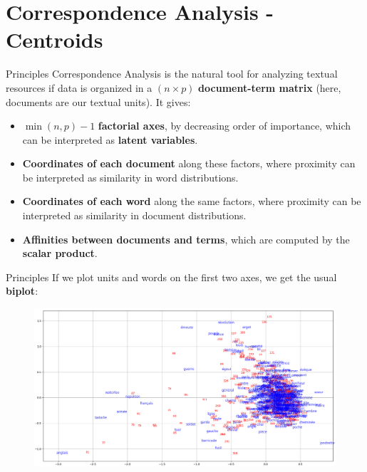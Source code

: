 \documentclass[10pt]{beamer}
\newcommand{\imp}[1]{\textbf{\color{cyan}#1}}
\begin{document}
	
	
	
	\section[Correspondence Analysis - Centroids]{Correspondence Analysis - Centroids}
	
	
	\begin{frame}{Principles}
		Correspondence Analysis is the natural tool for analyzing textual resources if data is organized in a $(n \times p)$ \imp{document-term matrix} \cite{lebart_analyse_2019} (here, documents are our textual units). It gives:
		\begin{itemize}
			\item $\min(n, p) - 1$ \imp{factorial axes}, by decreasing order of importance, which can be interpreted as \imp{latent variables}.
			\item \imp{Coordinates of each document} along these factors, where proximity can be interpreted as similarity in word distributions.
			\item \imp{Coordinates of each word} along the same factors, where proximity can be interpreted as similarity in document distributions.
			\item \imp{Affinities between documents and terms}, which are computed by the \imp{scalar product}.
		\end{itemize}
	\end{frame}
	
	
	\begin{frame}{Principles}
		If we plot units and words on the first two axes, we get the usual \imp{biplot}:
		\begin{figure}
			\centering
			\includegraphics[width=\textwidth]{img/biplot.png}
		\end{figure}
	\end{frame}
	
\end{document}
